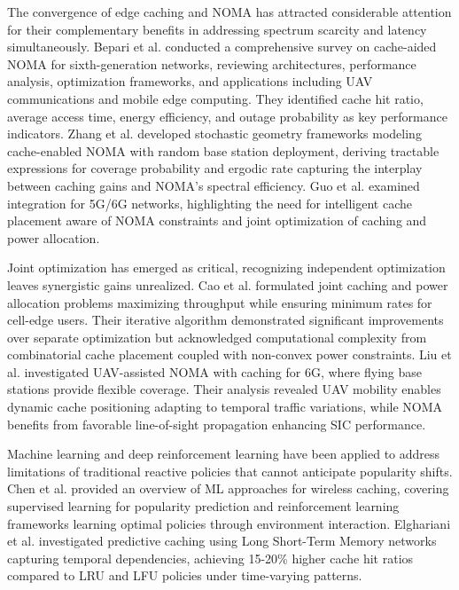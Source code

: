 \documentclass[12pt,a4paper]{article}
\begin{document}
The convergence of edge caching and NOMA has attracted considerable attention for their complementary benefits in addressing spectrum scarcity and latency simultaneously. Bepari et al. \cite{bepari2022survey} conducted a comprehensive survey on cache-aided NOMA for sixth-generation networks, reviewing architectures, performance analysis, optimization frameworks, and applications including UAV communications and mobile edge computing. They identified cache hit ratio, average access time, energy efficiency, and outage probability as key performance indicators. Zhang et al. \cite{zhang2018cache} developed stochastic geometry frameworks modeling cache-enabled NOMA with random base station deployment, deriving tractable expressions for coverage probability and ergodic rate capturing the interplay between caching gains and NOMA's spectral efficiency. Guo et al. \cite{guo2020edge} examined integration for 5G/6G networks, highlighting the need for intelligent cache placement aware of NOMA constraints and joint optimization of caching and power allocation.

Joint optimization has emerged as critical, recognizing independent optimization leaves synergistic gains unrealized. Cao et al. \cite{cao2021joint} formulated joint caching and power allocation problems maximizing throughput while ensuring minimum rates for cell-edge users. Their iterative algorithm demonstrated significant improvements over separate optimization but acknowledged computational complexity from combinatorial cache placement coupled with non-convex power constraints. Liu et al. \cite{liu2020uav} investigated UAV-assisted NOMA with caching for 6G, where flying base stations provide flexible coverage. Their analysis revealed UAV mobility enables dynamic cache positioning adapting to temporal traffic variations, while NOMA benefits from favorable line-of-sight propagation enhancing SIC performance.

Machine learning and deep reinforcement learning have been applied to address limitations of traditional reactive policies that cannot anticipate popularity shifts. Chen et al. \cite{chen2019machine} provided an overview of ML approaches for wireless caching, covering supervised learning for popularity prediction and reinforcement learning frameworks learning optimal policies through environment interaction. Elghariani et al. \cite{elghariani2019predictive} investigated predictive caching using Long Short-Term Memory networks capturing temporal dependencies, achieving 15-20\% higher cache hit ratios compared to LRU and LFU policies under time-varying patterns.
\end{document}
